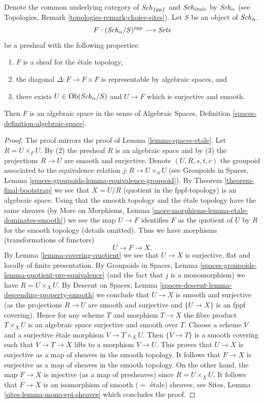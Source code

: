 \begin{lemma}
\label{lemma-spaces-etale-smooth-cover}
Denote the common underlying category of $\mathit{Sch}_{fppf}$
and $\mathit{Sch}_{\acute{e}tale}$ by $\mathit{Sch}_\alpha$ (see
Topologies, Remark \ref{topologies-remark-choice-sites}). Let $S$ be an object
of $\mathit{Sch}_\alpha$. 
$$
F : (\mathit{Sch}_\alpha/S)^{opp} \longrightarrow \textit{Sets}
$$
be a presheaf with the following properties:
\begin{enumerate}
\item $F$ is a sheaf for the \'etale topology,
\item the diagonal $\Delta : F \to F \times F$ is representable
by algebraic spaces, and
\item there exists $U \in \mathop{\mathrm{Ob}}\nolimits(\mathit{Sch}_\alpha/S)$
and $U \to F$ which is surjective and smooth.
\end{enumerate}
Then $F$ is an algebraic space in the sense of
Algebraic Spaces, Definition \ref{spaces-definition-algebraic-space}.
\end{lemma}

\begin{proof}
The proof mirrors the proof of Lemma \ref{lemma-spaces-etale}. Let
$R = U \times_F U$. By (2) the presheaf $R$ is an algebraic space and by (3)
the projections $R \to U$ are smooth and surjective. Denote $(U, R, s, t, c)$
the groupoid associated to the equivalence relation $j : R \to U \times_S U$
(see Groupoids in Spaces, Lemma
\ref{spaces-groupoids-lemma-equivalence-groupoid}).
By Theorem \ref{theorem-final-bootstrap} we see that $X = U/R$ (quotient
in the fppf-topology) is an algebraic space. Using that the smooth
topology and the \'etale topology have the same sheaves (by
More on Morphisms, Lemma \ref{more-morphisms-lemma-etale-dominates-smooth})
we see the map $U \to F$ identifies $F$ as the quotient of
$U$ by $R$ for the smooth topology (details omitted).
Thus we have morphisms (transformations of functors)
$$
U \to F \to X.
$$
By Lemma \ref{lemma-covering-quotient} we see that $U \to X$ is
surjective, flat and locally of finite presentation. By
Groupoids in Spaces, Lemma
\ref{spaces-groupoids-lemma-quotient-pre-equivalence}
(and the fact that $j$ is a monomorphism) we have $R = U \times_X U$. By
Descent on Spaces, Lemma \ref{spaces-descent-lemma-descending-property-smooth}
we conclude that $U \to X$ is smooth and surjective (as the projections
$R \to U$ are smooth and surjective and $\{U \to X\}$ is an fppf
covering). Hence for any scheme $T$ and morphism $T \to X$ the fibre product
$T \times_X U$ is an algebraic space surjective and smooth over $T$.
Choose a scheme $V$ and a surjective \'etale morphism $V \to T \times_X U$.
Then $\{V \to T\}$ is a smooth covering such that $V \to T \to X$
lifts to a morphism $V \to U$. This proves that
$U \to X$ is surjective as a map of sheaves in the smooth topology.
It follows that $F \to X$ is surjective as a map of sheaves in the smooth
topology. On the other hand, the map $F \to X$ is injective (as a map
of presheaves) since $R = U \times_X U$.
It follows that $F \to X$ is an isomorphism of smooth ($=$ \'etale)
sheaves, see Sites, Lemma \ref{sites-lemma-mono-epi-sheaves}
which concludes the proof.
\end{proof}

